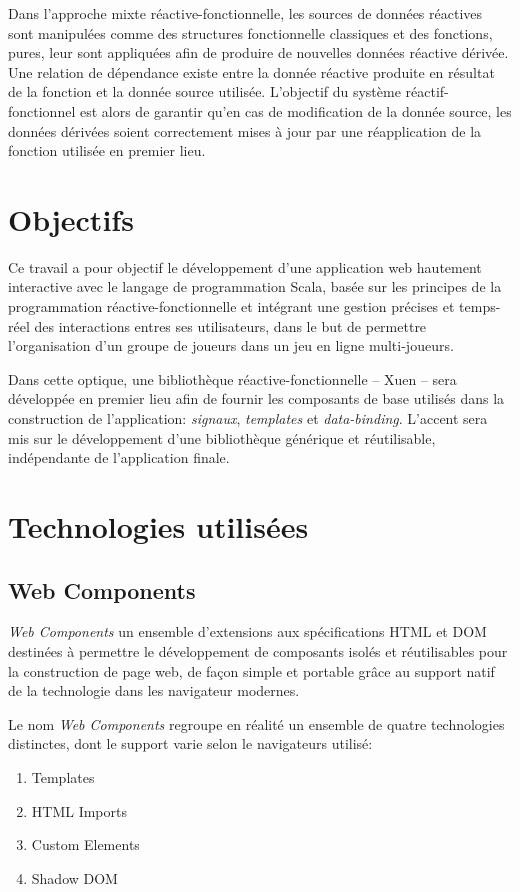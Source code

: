Dans l'approche mixte réactive-fonctionnelle, les sources de données réactives sont manipulées comme des structures fonctionnelle classiques et des fonctions, pures, leur sont appliquées afin de produire de nouvelles données réactive dérivée. Une relation de dépendance existe entre la donnée réactive produite en résultat de la fonction et la donnée source utilisée. L'objectif du système réactif-fonctionnel est alors de garantir qu'en cas de modification de la donnée source, les données dérivées soient correctement mises à jour par une réapplication de la fonction utilisée en premier lieu.

\section{Objectifs}

Ce travail a pour objectif le développement d'une application web hautement interactive avec le langage de programmation Scala, basée sur les principes de la programmation réactive-fonctionnelle et intégrant une gestion précises et temps-réel des interactions entres ses utilisateurs, dans le but de permettre l'organisation d'un groupe de joueurs dans un jeu en ligne multi-joueurs.

Dans cette optique, une bibliothèque réactive-fonctionnelle -- Xuen -- sera développée en premier lieu afin de fournir les composants de base utilisés dans la construction de l'application: \emph{signaux}, \emph{templates} et \emph{data-binding}. L'accent sera mis sur le développement d'une bibliothèque générique et réutilisable, indépendante de l'application finale.

\section{Technologies utilisées}

\subsection{Web Components}

\emph{Web Components} un ensemble d'extensions aux spécifications HTML et DOM destinées à permettre le développement de composants isolés et réutilisables pour la construction de page web, de façon simple et portable grâce au support natif de la technologie dans les navigateur modernes.

Le nom \emph{Web Components} regroupe en réalité un ensemble de quatre technologies distinctes, dont le support varie selon le navigateurs utilisé:
\begin{enumerate}
	\item Templates
	\item HTML Imports
	\item Custom Elements
	\item Shadow DOM
\end{enumerate}

